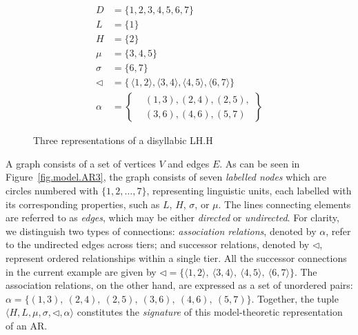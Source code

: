 \documentclass{CUP-JNL-PHO}%
\theoremstyle{definition}
\numberwithin{equation}{section}
\theoremstyle{definition}
\begin{document}
\begin{figure}[ht]
\begin{minipage}[b]{0.4\textwidth}
		\label{fig.model.AR2}
	\end{minipage}
	\hfill
	\begin{minipage}[b]{0.3\textwidth}
		\small
		\centering
		\begin{align*}
			D &= \{1, 2, 3, 4, 5, 6, 7\} \\
			L &= \{1\}\\
			H &= \{2\}\\
			\mu &= \{3, 4, 5\}\\
			\sigma &= \{6, 7\} \\
			\lhd &= \{\, \langle 1,2 \rangle, \langle 3,4 \rangle, \langle 4,5 \rangle,
			\langle 6,7 \rangle\} \\
		\alpha &= \left\{
		\begin{aligned}
			&(1,3),(2,4),(2,5),\\
			&(3,6),(4,6),(5,7)
		\end{aligned}
		\right\}
		\end{align*}
		\label{fig.model.AR3}
	\end{minipage}
	
	
	\caption{Three representations of a disyllabic LH.H}
	\label{fig.model.AR}
\end{figure}

A graph consists of a set of vertices $V$ and edges $E$.  
As can be seen in Figure~\ref{fig.model.AR3}, the graph consists
of seven \textit{labelled nodes} which are circles numbered with $\{1, 2,\dots,7\}$, 
representing linguistic units, each labelled with its corresponding properties, such
as $L$, $H$, $\sigma$, or $\mu$. 
The lines connecting elements are referred to as \textit{edges}, which 
may be either \textit{directed} or \textit{undirected}. For clarity, 
we distinguish two types of connections: \textit{association relations}, 
denoted by $\alpha$, refer to the undirected edges across tiers; 
and successor relations, denoted by $\lhd$, represent ordered relationships within a single tier. 
All the successor connections in the current example are given by
\( \lhd = \{\langle 1,2 \rangle,\ \langle 3,4 \rangle,\ \langle 4,5
\rangle,\ \langle 6,7 \rangle \}.\) The association relations, on the
other hand, are expressed as a set of unordered pairs:
\(\alpha = \{ (1,3),\ (2,4),\ (2,5),\ (3,6),\ (4,6),\ (5,7) \}.\)
Together, the tuple $\langle H, L, \mu, \sigma, \lhd, \alpha \rangle$
constitutes the \textit{signature} of this model-theoretic representation
of an AR.
\end{document}
